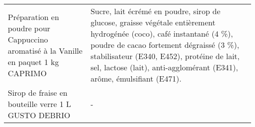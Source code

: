 \begin{longtable}{p{5cm}p{10cm}}
                      Préparation en poudre pour Cappuccino aromatisé à la Vanille en paquet 1 kg CAPRIMO &                                                                                                                                                                                                                                                                                                                                                                                                                                                                                                                                                                                                                                                                                                                                                 Sucre, lait écrémé en poudre, sirop de glucose, graisse végétale entièrement hydrogénée (coco), café instantané (4 \%), poudre de cacao fortement dégraissé (3 \%), stabilisateur (E340, E452), protéine de lait, sel, lactose (lait), anti-agglomérant (E341), arôme, émulsifiant (E471). \\
                                                      Sirop de fraise en bouteille verre 1 L GUSTO DEBRIO &                                                                                                                                                                                                                                                                                                                                                                                                                                                                                                                                                                                                                                                                                                                                                                                                                                                                                                                                                                                                                                        - \\

\end{longtable}

